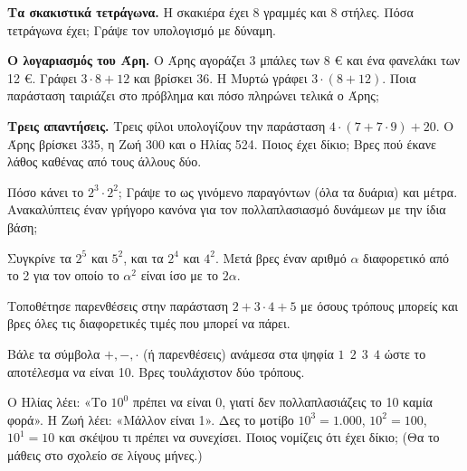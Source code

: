 \ex \textbf{Τα σκακιστικά τετράγωνα.} Η σκακιέρα έχει 8 γραμμές και 8 στήλες. Πόσα τετράγωνα έχει; Γράψε τον υπολογισμό με δύναμη.

\ex \textbf{Ο λογαριασμός του Άρη.} Ο Άρης αγοράζει 3 μπάλες των 8 € και ένα φανελάκι των 12 €. Γράφει $3\cdot 8+12$ και βρίσκει 36. Η Μυρτώ γράφει $3\cdot(8+12)$. Ποια παράσταση ταιριάζει στο πρόβλημα και πόσο πληρώνει τελικά ο Άρης;

\ex \textbf{Τρεις απαντήσεις.} Τρεις φίλοι υπολογίζουν την παράσταση $4\cdot(7+7\cdot 9)+20$. Ο Άρης βρίσκει 335, η Ζωή 300 και ο Ηλίας 524. Ποιος έχει δίκιο; Βρες πού έκανε λάθος καθένας από τους άλλους δύο.


\ex Πόσο κάνει το $2^3\cdot 2^2$; Γράψε το ως γινόμενο παραγόντων (όλα τα δυάρια) και μέτρα. Ανακαλύπτεις έναν γρήγορο κανόνα για τον πολλαπλασιασμό δυνάμεων με την ίδια βάση;

\ex Συγκρίνε τα $2^5$ και $5^2$, και τα $2^4$ και $4^2$. Μετά βρες έναν αριθμό $\alpha$ διαφορετικό από το 2 για τον οποίο το $\alpha^2$ είναι ίσο με το $2\alpha$.

\ex Τοποθέτησε παρενθέσεις στην παράσταση $2+3\cdot 4+5$ με όσους τρόπους μπορείς και βρες όλες τις διαφορετικές τιμές που μπορεί να πάρει.

\ex Βάλε τα σύμβολα $+,-,\cdot$ (ή παρενθέσεις) ανάμεσα στα ψηφία $1\ \ 2\ \ 3\ \ 4$ ώστε το αποτέλεσμα να είναι 10. Βρες τουλάχιστον δύο τρόπους.

\ex Ο Ηλίας λέει: «Το $10^0$ πρέπει να είναι 0, γιατί δεν πολλαπλασιάζεις το 10 καμία φορά». Η Ζωή λέει: «Μάλλον είναι 1». Δες το μοτίβο $10^3=1.000$, $10^2=100$, $10^1=10$ και σκέψου τι πρέπει να συνεχίσει. Ποιος νομίζεις ότι έχει δίκιο; (Θα το μάθεις στο σχολείο σε λίγους μήνες.)
